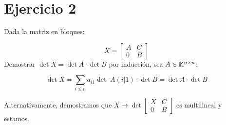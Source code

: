 \documentclass{article}
\begin{document}
\section*{Ejercicio 2}
Dada la matriz en bloques:

\[
	X = 
	\begin{bmatrix}
		A & C \\
		0 & B
	\end{bmatrix}
\]
Demostrar $\det X = \det A \cdot \det B$
por inducción, sea $A \in \mathbb{K}^{n \times n}$:

\[\det X = \sum_{i \leq n} a_{i1} \det \; A(i|1) \cdot \det B = \det A \cdot \det B\]

Alternativamente, demostramos que $X \mapsto \det
\begin{bmatrix}
	X & C\\
	0 & B
\end{bmatrix}
$ es multilineal y estamos.
\end{document}
